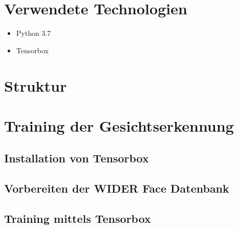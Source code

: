 \section{Verwendete Technologien}
\begin{itemize}
\item Python 3.7
\item Tensorbox
\end{itemize}

\section{ Struktur}
\section{Training der Gesichtserkennung }\label{training-gesicht}
\subsection{Installation von Tensorbox }
\subsection{Vorbereiten der WIDER Face Datenbank}
\subsection{Training  mittels Tensorbox}

